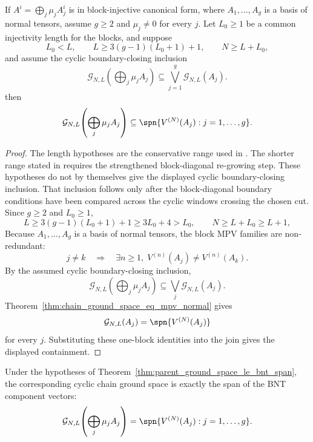 \begin{theorem}
    \label{thm:parent_ground_space_le_bnt_span}
    \notready
    If $A^i=\bigoplus_j\mu_j A_j^i$ is in block-injective canonical form, where
    $A_1,\ldots,A_g$ is a basis of normal tensors, assume $g\ge2$ and
    $\mu_j\ne0$ for every $j$. Let $L_0\ge1$ be a common injectivity length for
    the blocks, and suppose
    \[
        L_0<L,
        \qquad
        L\ge 3(g-1)(L_0+1)+1,
        \qquad
        N\ge L+L_0,
    \]
    and assume the cyclic boundary-closing inclusion
    \[
        \mathcal G_{N,L}\!\left(\bigoplus_j \mu_j A_j\right)
        \subseteq
        \bigvee_{j=1}^g\mathcal G_{N,L}(A_j).
    \]
    then
    \[
        \mathcal G_{N,L}\!\left(\bigoplus_j \mu_j A_j\right)
        \subseteq
        \spn\{V^{(N)}(A_j): j=1,\ldots,g\}.
    \]
\end{theorem}

\begin{proof}
    \notready
    The length hypotheses are the conservative range used in
    \cite[Theorem~2blocks.2]{PerezGarcia2007Matrix}. The shorter range stated in
    \cite[lines~2126--2128]{Cirac2021Matrix} requires the strengthened
    block-diagonal re-growing step. These hypotheses do not by themselves give
    the displayed cyclic boundary-closing inclusion. That inclusion follows only
    after the block-diagonal boundary conditions have been compared across the
    cyclic windows crossing the chosen cut. Since $g\ge2$
    and $L_0\ge1$,
    \[
        L\ge 3(g-1)(L_0+1)+1 \ge 3L_0+4 > L_0,
        \qquad
        N\ge L+L_0\ge L+1,
    \]
    Because $A_1,\ldots,A_g$ is a basis of normal tensors, the block MPV
    families are non-redundant:
    \[
        j\ne k
        \quad\Longrightarrow\quad
        \exists n\ge1,\; V^{(n)}(A_j)\ne V^{(n)}(A_k).
    \]
    By the assumed cyclic boundary-closing inclusion,
    \[
        \mathcal G_{N,L}\!\left(\bigoplus_j \mu_j A_j\right)
        \subseteq
        \bigvee_j \mathcal G_{N,L}(A_j).
    \]
    Theorem~\ref{thm:chain_ground_space_eq_mpv_normal} gives
    \[
        \mathcal G_{N,L}(A_j)
        =
        \spn\{V^{(N)}(A_j)\}
    \]
    for every $j$. Substituting these one-block identities into the join gives
    the displayed containment.
\end{proof}

\begin{theorem}
    \label{thm:gs_eq_bnt_span}
    \notready
    Under the hypotheses of
    Theorem~\ref{thm:parent_ground_space_le_bnt_span}, the corresponding cyclic
    chain ground space is exactly the span of the BNT component vectors:
    \[
        \mathcal G_{N,L}\!\left(\bigoplus_j \mu_j A_j\right)
        =
        \spn\{V^{(N)}(A_j): j=1,\ldots,g\}.
    \]
\end{theorem}

